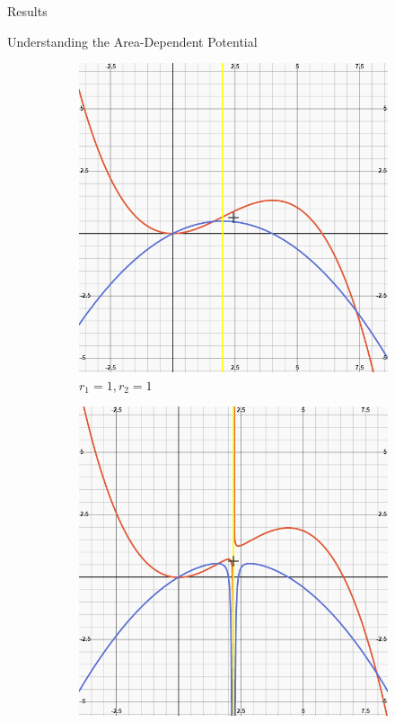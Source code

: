 \documentclass[12pt]{article}
\begin{document}
\begin{section}{Results}
\begin{subsection}{Understanding the Area-Dependent Potential}
\begin{figure}[h!]
    \begin{subfigure}{0.5\textwidth}
        \includegraphics[width=0.9\linewidth]{images/potential_graph_1.png}
        \caption{$r_1 =1 ,  r_2 = 1$}
        \label{fig:sub1}
    \end{subfigure}
    \begin{subfigure}{0.5\textwidth}
        \includegraphics[width=0.9\linewidth]{images/potential_graph_2.png}

\end{subfigure}
\end{figure}
\end{subsection}
\end{section}
\end{document}
